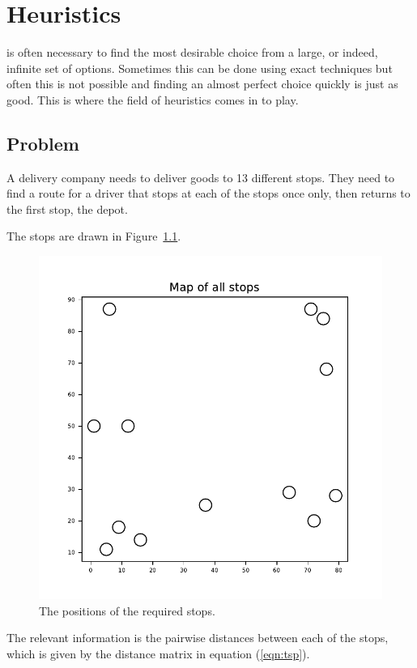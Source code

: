 \chapter[Heuristics]{Heuristics}\label{chp:heuristics}


 is often necessary to find the most desirable choice from
a large, or indeed, infinite set of options. Sometimes this can be done using
exact techniques but often this is not possible and finding an almost perfect
choice quickly is just as good. This is where the field of heuristics comes in
to play.

\section{Problem}\label{sec:heuristics_problem}

A delivery company needs to deliver goods to 13 different stops.
They need to find a route for a driver that stops at each of the stops
once only, then returns to the first stop, the depot.

The stops are drawn in Figure~\ref{fig:tsp}.

\begin{figure}
    \begin{center}
        \includegraphics[width=.8\textwidth]{./assets/tsp/main.pdf}
    \end{center}
    \caption{The positions of the required stops.}
    \label{fig:tsp}
\end{figure}

The relevant information is the pairwise distances between each of the stops,
which is given by the distance matrix in equation (\ref{eqn:tsp}).

